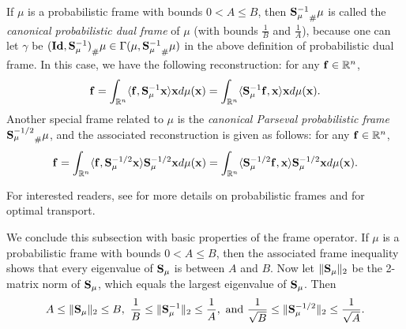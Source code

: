 \documentclass{amsart}
\numberwithin{equation}{section}
\theoremstyle{plain}
\theoremstyle{definition}
\begin{document}
If $\mu$ is a probabilistic frame with bounds $0<A \leq B$, then ${{\bf S}_\mu^{-1}}_{\#}\mu$ is called the \emph{canonical probabilistic dual frame} of $\mu$ (with bounds $\frac{1}{B}$ and $ \frac{1}{A}$), because one can let $\gamma$ be ${({\bf Id}, {\bf S}_\mu^{-1})}_{\#}\mu \in \Gamma(\mu, {{\bf S}_\mu^{-1}}_{\#}\mu)$ in the above definition of probabilistic dual frame. In this case, we have the following  reconstruction: for any ${\bf f} \in \mathbb{R}^n$, 
\begin{equation}\label{reconstruction2}
   {\bf f}=   \int_{\mathbb{R}^n} \langle  {\bf f}, {\bf S}_\mu^{-1} {\bf x} \rangle {\bf x}  d\mu({\bf x}) =\int_{\mathbb{R}^n} \langle  {\bf S}_\mu^{-1} {\bf f}, {\bf x} \rangle {\bf x}  d\mu({\bf x}). 
\end{equation}
Another special frame related to $\mu$ is the \emph{canonical Parseval probabilistic frame} ${{\bf S}_{\mu}^{-1/2}}_{\#}\mu$, and the associated reconstruction is given as follows: for any ${\bf f} \in \mathbb{R}^n$, 
\begin{equation}\label{reconstruction1}
   {\bf f}=\int_{\mathbb{R}^n} \langle {\bf f}, {\bf S}_\mu^{-1/2} {\bf x} \rangle {\bf S}_\mu^{-1/2} {\bf x}   d\mu({\bf x})= \int_{\mathbb{R}^n} \langle {\bf S}_\mu^{-1/2} {\bf f}, {\bf x} \rangle {\bf S}_\mu^{-1/2} {\bf x}   d\mu({\bf x}).
\end{equation}

For interested readers, see \cite{ehler2012random, ehler2011frame, chen2025probabilistic, maslouhi2019probabilistic, ehler2013probabilistic, wickman2017duality, ehler2012minimization, wickman2014optimal,cheng2019optimal, loukili2020minimization, wickman2023gradient} for more details on probabilistic frames and \cite{figalli2021invitation} for optimal transport.


We conclude this subsection with basic properties of the frame operator. If $\mu$ is a probabilistic frame with bounds $0< A \leq B$, then the associated frame inequality shows that every eigenvalue of ${\bf S}_\mu$ is between $A$ and $B$.  Now let $\Vert {\bf S}_\mu \Vert_2$ be the 2-matrix norm of ${\bf S}_\mu$, which equals the largest eigenvalue of ${\bf S}_{\mu}$. Then
\begin{equation*}
   A \leq  \Vert {\bf S}_\mu \Vert_2 \leq B, \  \frac{1}{B} \leq  \Vert {\bf S}_\mu^{-1} \Vert_2 \leq \frac{1}{A},  \ \text{and} \  \frac{1}{\sqrt{B}} \leq  \Vert {\bf S}_\mu^{-1/2} \Vert_2 \leq \frac{1}{\sqrt{A}}.
\end{equation*}
\end{document}
